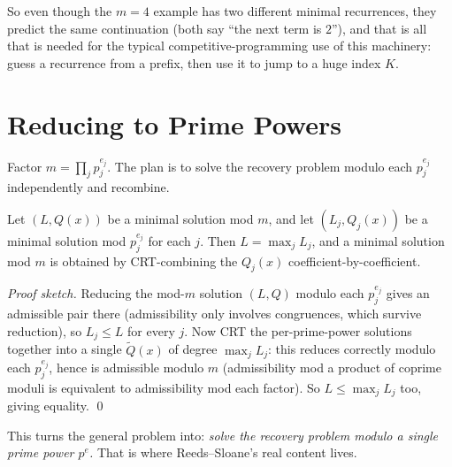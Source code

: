 \documentclass[11pt]{article}
\begin{document}
So even though the $m=4$ example has two different minimal recurrences, they
predict the same continuation (both say ``the next term is $2$''), and that
is all that is needed for the typical competitive-programming use of this
machinery: guess a recurrence from a prefix, then use it to jump to a huge
index $K$.

\section{Reducing to Prime Powers}
Factor $m = \prod_{j} p_j^{e_j}$. The plan is to solve the recovery problem
modulo each $p_j^{e_j}$ independently and recombine.

\begin{theorembox}
Let $(L, Q(x))$ be a minimal solution mod $m$, and let $(L_j, Q_j(x))$ be a
minimal solution mod $p_j^{e_j}$ for each $j$. Then $L = \max_j L_j$, and a
minimal solution mod $m$ is obtained by CRT-combining the $Q_j(x)$
coefficient-by-coefficient.

\emph{Proof sketch.} Reducing the mod-$m$ solution $(L,Q)$ modulo each
$p_j^{e_j}$ gives an admissible pair there (admissibility only involves
congruences, which survive reduction), so $L_j \le L$ for every $j$. Now CRT
the per-prime-power solutions together into a single $\tilde Q(x)$ of degree
$\max_j L_j$: this reduces correctly modulo each $p_j^{e_j}$, hence is
admissible modulo $m$ (admissibility mod a product of coprime moduli is
equivalent to admissibility mod each factor). So $L \le \max_j L_j$ too,
giving equality. \qed
\end{theorembox}

This turns the general problem into: \emph{solve the recovery problem modulo
a single prime power $p^e$.} That is where Reeds--Sloane's real content
lives.
\end{document}
